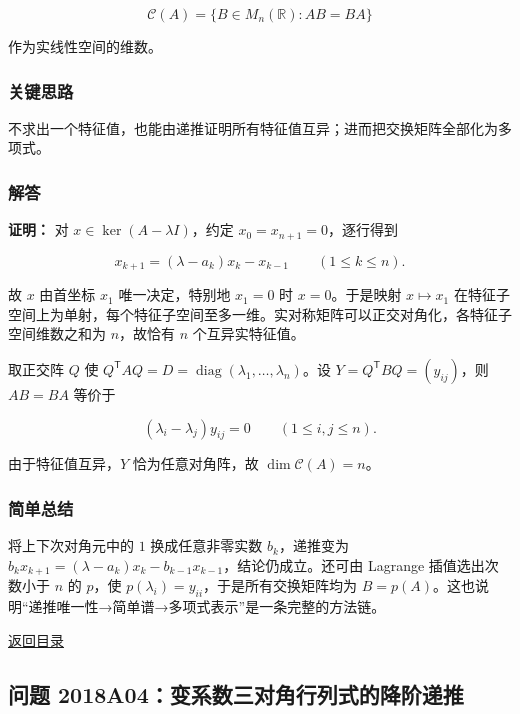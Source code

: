\documentclass[11pt,a4paper]{article}
\begin{document}
\[
\mathcal C(A)=\{B\in M_n(\mathbb R):AB=BA\}
\]

作为实线性空间的维数。

\subsubsection{关键思路}\label{ux5173ux952eux601dux8def-29}

不求出一个特征值，也能由递推证明所有特征值互异；进而把交换矩阵全部化为多项式。

\subsubsection{解答}\label{ux89e3ux7b54-29}

\textbf{证明：} 对 \(x\in\ker(A-\lambda I)\)，约定
\(x_0=x_{n+1}=0\)，逐行得到

\[
x_{k+1}=(\lambda-a_k)x_k-x_{k-1}\qquad(1\le k\le n).
\]

故 \(x\) 由首坐标 \(x_1\) 唯一决定，特别地 \(x_1=0\) 时
\(x=0\)。于是映射 \(x\mapsto x_1\)
在特征子空间上为单射，每个特征子空间至多一维。实对称矩阵可以正交对角化，各特征子空间维数之和为
\(n\)，故恰有 \(n\) 个互异实特征值。

取正交阵 \(Q\) 使
\(Q^{\mathsf T}AQ=D=\operatorname{diag}(\lambda_1,\ldots,\lambda_n)\)。设
\(Y=Q^{\mathsf T}BQ=(y_{ij})\)，则 \(AB=BA\) 等价于

\[
(\lambda_i-\lambda_j)y_{ij}=0\qquad(1\le i,j\le n).
\]

由于特征值互异，\(Y\) 恰为任意对角阵，故 \(\dim\mathcal C(A)=n\)。

\subsubsection{简单总结}\label{ux7b80ux5355ux603bux7ed3-29}

将上下次对角元中的 \(1\) 换成任意非零实数 \(b_k\)，递推变为
\(b_kx_{k+1}=(\lambda-a_k)x_k-b_{k-1}x_{k-1}\)，结论仍成立。还可由
Lagrange 插值选出次数小于 \(n\) 的 \(p\)，使
\(p(\lambda_i)=y_{ii}\)，于是所有交换矩阵均为
\(B=p(A)\)。这也说明``递推唯一性→简单谱→多项式表示''是一条完整的方法链。

\noindent\hyperref[contents]{返回目录}

\subsection{问题
2018A04：变系数三对角行列式的降阶递推}\label{ux95eeux9898-2018a04ux53d8ux7cfbux6570ux4e09ux5bf9ux89d2ux884cux5217ux5f0fux7684ux964dux9636ux9012ux63a8}
\end{document}
